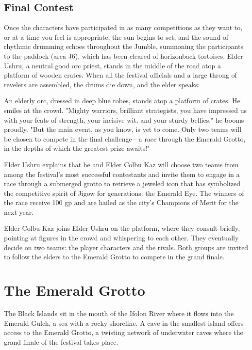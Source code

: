 \documentclass[10pt,a4paper,twoside,bg=print,twocolumn,openany,nodeprecatedcode]{dndbook}
\begin{document}
\subsection{Final Contest}
Once the characters have participated in as many competitions as they want to, or at a time you feel is appropriate, the sun begins to set, and the sound of rhythmic drumming echoes throughout the Jumble, summoning the participants to the paddock (area J6), which has been cleared of horizonback tortoises. Elder Ushru, a neutral good orc priest, stands in the middle of the road atop a platform of wooden crates. When all the festival officials and a large throng of revelers are assembled, the drums die down, and the elder speaks:

\begin{DndReadAloud}{}
An elderly orc, dressed in deep blue robes, stands atop a platform of crates. He smiles at the crowd. "Mighty warriors, brilliant strategists, you have impressed us with your feats of strength, your incisive wit, and your sturdy bellies," he booms proudly. "But the main event, as you know, is yet to come. Only two teams will be chosen to compete in the final challenge—a race through the Emerald Grotto, in the depths of which the greatest prize awaits!"

\end{DndReadAloud}

Elder Ushru explains that he and Elder Colbu Kaz will choose two teams from among the festival's most successful contestants and invite them to engage in a race through a submerged grotto to retrieve a jeweled icon that has symbolized the competitive spirit of Jigow for generations: the Emerald Eye. The winners of the race receive 100 gp and are hailed as the city's Champions of Merit for the next year.

Elder Colbu Kaz joins Elder Ushru on the platform, where they consult briefly, pointing at figures in the crowd and whispering to each other. They eventually decide on two teams: the player characters and the rivals. Both groups are invited to follow the elders to the Emerald Grotto to compete in the grand finale.

\section{The Emerald Grotto}
The Black Islands sit in the mouth of the Ifolon River where it flows into the Emerald Gulch, a sea with a rocky shoreline. A cave in the smallest island offers access to the Emerald Grotto, a twisting network of underwater caves where the grand finale of the festival takes place.
\end{document}
